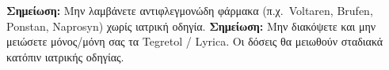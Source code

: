 \documentclass[10pt,greek]{article}
\begin{document}
\begin{MedTable}
\end{MedTable}

\textbf{Σημείωση:} Μην λαμβάνετε αντιφλεγμονώδη φάρμακα (π.χ.\ Voltaren, Brufen, Ponstan, Naprosyn) χωρίς ιατρική οδηγία.
\textbf{Σημείωση:} Μην διακόψετε και μην μειώσετε μόνος/μόνη σας τα Tegretol / Lyrica. Οι δόσεις θα μειωθούν σταδιακά κατόπιν ιατρικής οδηγίας.
\end{document}

